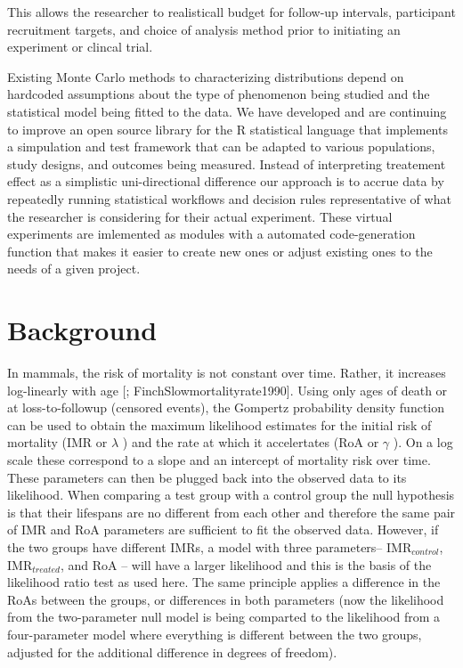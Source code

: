 \documentclass[review, authoryear]{elsarticle}
\begin{document}
This allows the researcher to realisticall budget for follow-up
intervals, participant recruitment targets, and choice of analysis
method prior to initiating an experiment or clincal trial.

Existing Monte Carlo methods to characterizing distributions
\citep{fang08, schoemann14} depend on hardcoded assumptions about the
type of phenomenon being studied and the statistical model being fitted
to the data. We have developed and are continuing to improve an open
source library for the R statistical language that implements a
simpulation and test framework that can be adapted to various
populations, study designs, and outcomes being measured. Instead of
interpreting treatement effect as a simplistic uni-directional
difference our approach is to accrue data by repeatedly running
statistical workflows and decision rules representative of what the
researcher is considering for their actual experiment. These virtual
experiments are imlemented as modules with a automated code-generation
function that makes it easier to create new ones or adjust existing ones
to the needs of a given project.

\section{Background}\label{background}

In mammals, the risk of mortality is not constant over time. Rather, it
increases log-linearly with age
{[}\citet{MuellerGompertzequationpredictive1995};
FinchSlowmortalityrate1990{]}. Using only ages of death or at
loss-to-followup (censored events), the Gompertz probability density
function can be used to obtain the maximum likelihood estimates for the
initial risk of mortality (IMR or \(\lambda\) ) and the rate at which it
accelertates (RoA or \(\gamma\) ). On a log scale these correspond to a
slope and an intercept of mortality risk over time. These parameters can
then be plugged back into the observed data to its likelihood. When
comparing a test group with a control group the null hypothesis is that
their lifespans are no different from each other and therefore the same
pair of IMR and RoA parameters are sufficient to fit the observed data.
However, if the two groups have different IMRs, a model with three
parameters-- IMR\(_{control}\), IMR\(_{treated}\), and RoA -- will have
a larger likelihood and this is the basis of the likelihood ratio test
as used here. The same principle applies a difference in the RoAs
between the groups, or differences in both parameters (now the
likelihood from the two-parameter null model is being comparted to the
likelihood from a four-parameter model where everything is different
between the two groups, adjusted for the additional difference in
degrees of freedom).
\end{document}
